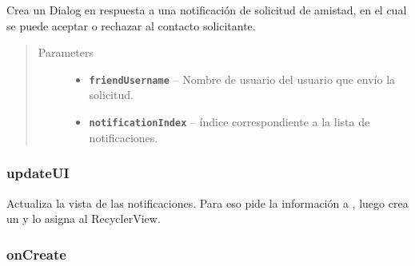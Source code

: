\documentclass[letterpaper,10pt,english]{sphinxmanual}
\begin{document}
\begin{fulllineitems}
\label{Fragments/NotificationsFragment:com.fiuba.tallerii.jobify.NotificationsFragment.createAddFriendDialog(String, int)}
Crea un Dialog en respuesta a una notificación de solicitud de amistad, en el cual se puede aceptar o rechazar al contacto solicitante.
\begin{quote}\begin{description}
\item[{Parameters}] \leavevmode\begin{itemize}
\item {} 
\textbf{\texttt{friendUsername}} -- Nombre de usuario del usuario que envío la solicitud.

\item {} 
\textbf{\texttt{notificationIndex}} -- índice correspondiente a la lista de notificaciones.

\end{itemize}

\end{description}\end{quote}

\end{fulllineitems}



\subsubsection{updateUI}
\label{Fragments/NotificationsFragment:updateui}

\begin{fulllineitems}
\label{Fragments/NotificationsFragment:com.fiuba.tallerii.jobify.NotificationsFragment.updateUI()}
Actualiza la vista de las notificaciones. Para eso pide la información a , luego crea un  y lo asigna al RecyclerView.

\end{fulllineitems}



\subsubsection{onCreate}
\label{Fragments/NotificationsFragment:oncreate}
\end{document}
